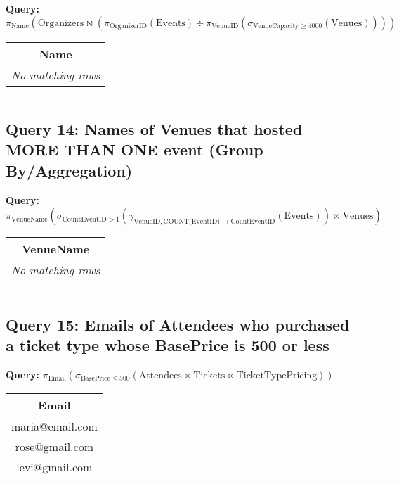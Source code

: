 \documentclass{article}
\begin{document}
\noindent \textbf{Query:} $\pi_{\text{Name}} (\text{Organizers} \bowtie (\pi_{\text{OrganizerID}} (\text{Events}) \div \pi_{\text{VenueID}} (\sigma_{\text{VenueCapacity} \ge 4000} (\text{Venues}))))$

\begin{center}
\begin{tabular}{c}
\toprule
\textbf{Name} \\
\midrule
\multicolumn{1}{c}{\emph{No matching rows}} \\
\bottomrule
\end{tabular}
\end{center}

\hrule

\subsection*{Query 14: Names of Venues that hosted MORE THAN ONE event (Group By/Aggregation)}

\noindent \textbf{Query:} $\pi_{\text{VenueName}} \left( \sigma_{\text{CountEventID} > 1} \left( \gamma_{\text{VenueID}, \text{COUNT(EventID)} \to \text{CountEventID}} (\text{Events}) \right) \bowtie \text{Venues} \right)$

\begin{center}
\begin{tabular}{c}
\toprule
\textbf{VenueName} \\
\midrule
\multicolumn{1}{c}{\emph{No matching rows}} \\
\bottomrule
\end{tabular}
\end{center}

\hrule

\subsection*{Query 15: Emails of Attendees who purchased a ticket type whose BasePrice is 500 or less}

\noindent \textbf{Query:} $\pi_{\text{Email}} \left( \sigma_{\text{BasePrice} \le 500} \left( \text{Attendees} \bowtie \text{Tickets} \bowtie \text{TicketTypePricing} \right) \right)$

\begin{center}
\begin{tabular}{c}
\toprule
\textbf{Email} \\
\midrule
maria@email.com \\
rose@gmail.com \\
levi@gmail.com \\
\bottomrule
\end{tabular}
\end{center}
\end{document}

